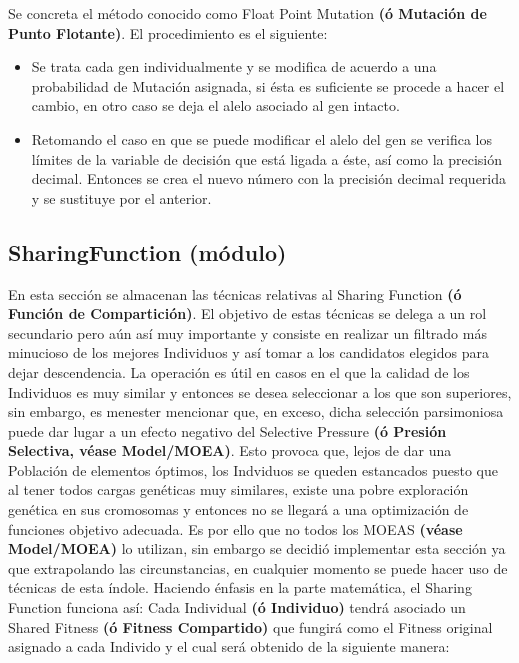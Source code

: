 \documentclass[class=report, crop=false]{standalone}
\begin{document}
\begin{fulllineitems}

\begin{DUlineblock}{0em}
\item[] Se concreta el método conocido como Float Point 
Mutation \textbf{(ó Mutación de Punto Flotante)}.\break
El procedimiento es el siguiente:

\begin{itemize}
\item Se trata cada gen individualmente y se modifica de acuerdo a una probabilidad de Mutación asignada, si ésta es suficiente se procede a hacer el cambio, en otro caso se deja el alelo asociado al gen intacto.
\item Retomando el caso en que se puede modificar el alelo del gen se verifica los límites de la variable de decisión que está ligada a éste, así como la precisión decimal. Entonces se crea el nuevo número con la precisión decimal requerida y se sustituye por el anterior.
\end{itemize}

\end{DUlineblock}

\end{fulllineitems}

\subsection{SharingFunction (módulo)}
\label{sec:a_2_5}
En esta sección se almacenan las técnicas relativas 
al Sharing Function \textbf{(ó Función de Compartición)}.\medskip\break
El objetivo de estas técnicas se delega a un rol secundario pero 
aún así muy importante y consiste en realizar un filtrado más 
minucioso de los mejores Individuos y así tomar a los candidatos 
elegidos para dejar descendencia.\break
La operación es útil en casos en el que la calidad de los 
Individuos es muy similar y entonces se desea seleccionar a 
los que son superiores, sin embargo, es menester mencionar que, 
en exceso, dicha selección parsimoniosa puede dar lugar a un efecto 
negativo del Selective Pressure \textbf{(ó Presión Selectiva, véase Model/MOEA)}.\break
Esto provoca que, lejos de dar una Población de elementos 
óptimos, los Indviduos se queden estancados puesto que al tener 
todos cargas genéticas muy similares, existe una pobre exploración 
genética en sus cromosomas y entonces no se llegará a una optimización 
de funciones objetivo adecuada.\medskip\break
Es por ello que no todos los MOEAS \textbf{(véase Model/MOEA)} 
lo utilizan, sin embargo se decidió implementar esta sección ya que 
extrapolando las circunstancias, en cualquier momento se puede hacer 
uso de técnicas de esta índole.\medskip\break
Haciendo énfasis en la parte matemática, el Sharing Function funciona así:\medskip\break
Cada Individual \textbf{(ó Individuo)} tendrá asociado un Shared Fitness 
\textbf{(ó Fitness Compartido)} que fungirá como el Fitness original asignado 
a cada Individo y el cual será obtenido de la siguiente manera:
\end{document}
